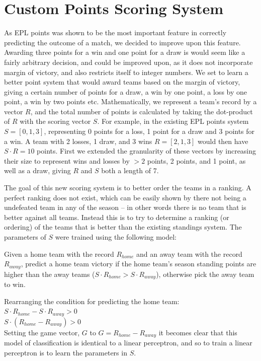 \documentclass[conference]{IEEEtran}
\begin{document}
\section{Custom Points Scoring System}
As EPL points was shown to be the most important feature in correctly predicting the outcome of a match, we decided to improve upon this feature. Awarding three points for a win and one point for a draw is would seem like a fairly arbitrary decision, and could be improved upon, as it does not incorporate margin of victory, and also restricts itself to integer numbers. We set to learn a better point system that would award teams based on the margin of victory, giving a certain number of points for a draw, a win by one point, a loss by one point, a win by two points etc. Mathematically, we represent a team's record by a vector $R$, and the total number of points is calculated by taking the dot-product of $R$ with the scoring vector $S$. For example, in the existing EPL points system $S=[0, 1, 3]$, representing 0 points for a loss, 1 point for a draw and 3 points for a win. A team with 2 losses, 1 draw, and 3 wins $R = [2,1,3]$ would then have $S \cdot R = 10$ points. First we extended the granularity of these vectors by increasing their size to represent wins and losses by $>2$ points, 2 points, and 1 point, as well as a draw, giving $R$ and $S$ both a length of 7. 

The goal of this new scoring system is to better order the teams in a ranking. A perfect ranking does not exist, which can be easily shown by there not being a undefeated team in any of the season -- in other words there is no team that is better against all teams. Instead this is to try to determine a ranking (or ordering) of the teams that is better than the existing standings system. The parameters of $S$ were trained using the following model:

Given a home team with the record $R_{home}$ and an away team with the record $R_{away}$, predict a home team victory if the home team's season standing points are higher than the away teams ($S \cdot R_{home} > S \cdot R_{away}$), otherwise pick the away team to win.

Rearranging the condition for predicting the home team:\\$S \cdot R_{home} - S \cdot R_{away} > 0$\\
$S \cdot (R_{home} - R_{away} ) > 0 $\\
Setting the game vector, $G$ to $G = R_{home} - R_{away}$ it becomes clear that this model of classification is identical to a linear perceptron, and so to train a linear perceptron is to learn the parameters in $S$. 
\end{document}
